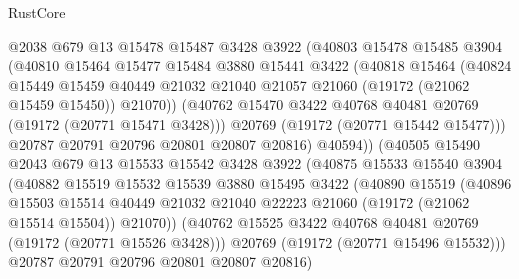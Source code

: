 \begin{lexlean}{RustCore}
\begin{coremodule}
                    @2038
                    @679
                    @13
                    @15478
                    @15487
                    @3428
                    @3922
                    (@40803
                      @15478
                      @15485
                      @3904
                      (@40810
                        @15464
                        @15477
                        @15484
                        @3880
                        @15441
                        @3422
                        (@40818
                          @15464
                          (@40824
                            @15449
                            @15459
                            @40449
                            @21032
                            @21040
                            @21057
                            @21060
                            (@19172 (@21062 @15459 @15450))
                            @21070))
                        (@40762 @15470 @3422 @40768 @40481 @20769 (@19172 (@20771 @15471 @3428)))
                        @20769
                        (@19172 (@20771 @15442 @15477)))
                      @20787
                      @20791
                      @20796
                      @20801
                      @20807
                      @20816)
                    @40594))
                (@40505
                  @15490
                  @2043
                  @679
                  @13
                  @15533
                  @15542
                  @3428
                  @3922
                  (@40875
                    @15533
                    @15540
                    @3904
                    (@40882
                      @15519
                      @15532
                      @15539
                      @3880
                      @15495
                      @3422
                      (@40890
                        @15519
                        (@40896
                          @15503
                          @15514
                          @40449
                          @21032
                          @21040
                          @22223
                          @21060
                          (@19172 (@21062 @15514 @15504))
                          @21070))
                      (@40762 @15525 @3422 @40768 @40481 @20769 (@19172 (@20771 @15526 @3428)))
                      @20769
                      (@19172 (@20771 @15496 @15532)))
                    @20787
                    @20791
                    @20796
                    @20801
                    @20807
                    @20816)

\end{coremodule}
\end{lexlean}
